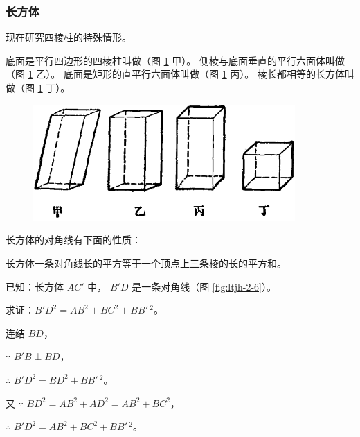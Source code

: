 \subsubsection{长方体}

现在研究四棱柱的特殊情形。

底面是平行四边形的四棱柱叫做（图 \ref{fig:ltjh-2-5} 甲）。
侧棱与底面垂直的平行六面体叫做（图 \ref{fig:ltjh-2-5} 乙）。
底面是矩形的直平行六面体叫做（图 \ref{fig:ltjh-2-5} 丙）。
棱长都相等的长方体叫做（图 \ref{fig:ltjh-2-5} 丁）。

\begin{figure}[htbp]
    \centering
    \includegraphics[width=10cm]{../pic/ltjh-ch2-05.png}
    \caption{}\label{fig:ltjh-2-5}
\end{figure}

长方体的对角线有下面的性质：

\begin{dingli}[定理][dl:cftdjx]
    长方体一条对角线长的平方等于一个顶点上三条棱的长的平方和。
\end{dingli}


已知：长方体 $AC'$ 中， $B'D$ 是一条对角线（图 \ref{fig:ltjh-2-6}）。

求证：$B'D^2 = AB^2 + BC^2 + BB'\,^2$。

\zhengming 连结 $BD$，

$\because$ \quad $B'B \perp BD$，

$\therefore$ \quad $B'D^2 = BD^2 + BB'\,^2$。

又 $\because$ \quad $BD^2 = AB^2 + AD^2 = AB^2 + BC^2$，

$\therefore$ \quad $B'D^2 = AB^2 + BC^2 + BB'\,^2$。

